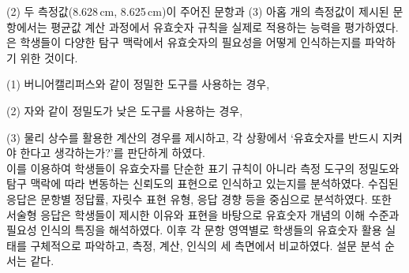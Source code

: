 (2) 두 측정값(8.628\,cm, 8.625\,cm)이 주어진 문항과
(3) 아홉 개의 측정값이 제시된 문항에서는 평균값 계산 과정에서
유효숫자 규칙을 실제로 적용하는 능력을 평가하였다. \\

은
학생들이 다양한 탐구 맥락에서 유효숫자의 필요성을 어떻게 인식하는지를 파악하기 위한 것이다.

(1) 버니어캘리퍼스와 같이 정밀한 도구를 사용하는 경우,

(2) 자와 같이 정밀도가 낮은 도구를 사용하는 경우,

(3) 물리 상수를 활용한 계산의 경우를 제시하고,
각 상황에서 `유효숫자를 반드시 지켜야 한다고 생각하는가?'를 판단하게 하였다. \\

이를 이용하여 학생들이 유효숫자를 단순한 표기 규칙이 아니라
측정 도구의 정밀도와 탐구 맥락에 따라 변동하는 신뢰도의 표현으로 인식하고 있는지를 분석하였다.
수집된 응답은 문항별 정답률, 자릿수 표현 유형, 응답 경향 등을 중심으로 분석하였다.
또한 서술형 응답은 학생들이 제시한 이유와 표현을 바탕으로
유효숫자 개념의 이해 수준과 필요성 인식의 특징을 해석하였다.
%
이후 각 문항 영역별로 학생들의 유효숫자 활용 실태를 구체적으로 파악하고,
측정, 계산, 인식의 세 측면에서 비교하였다.
설문 분석 순서는 \와 같다.

\SurveyProcess
